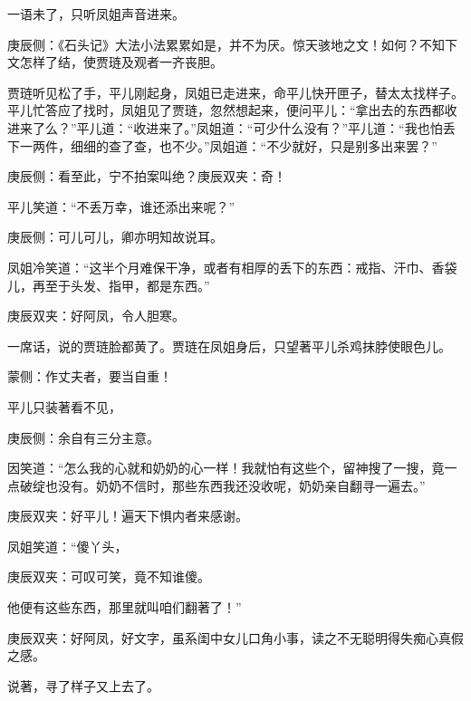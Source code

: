 \begin{parag}
    一语未了，只听凤姐声音进来。\begin{note}庚辰侧：《石头记》大法小法累累如是，并不为厌。惊天骇地之文！如何？不知下文怎样了结，使贾琏及观者一齐丧胆。\end{note}贾琏听见松了手，平儿刚起身，凤姐已走进来，命平儿快开匣子，替太太找样子。平儿忙答应了找时，凤姐见了贾琏，忽然想起来，便问平儿：“拿出去的东西都收进来了么？”平儿道：“收进来了。”凤姐道：“可少什么没有？”平儿道：“我也怕丢下一两件，细细的查了查，也不少。”凤姐道：“不少就好，只是别多出来罢？”\begin{note}庚辰侧：看至此，宁不拍案叫绝？庚辰双夹：奇！\end{note}平儿笑道：“不丢万幸，谁还添出来呢？”\begin{note}庚辰侧：可儿可儿，卿亦明知故说耳。\end{note}凤姐冷笑道：“这半个月难保干净，或者有相厚的丢下的东西：戒指、汗巾、香袋儿，再至于头发、指甲，都是东西。”\begin{note}庚辰双夹：好阿凤，令人胆寒。\end{note}一席话，说的贾琏脸都黄了。贾琏在凤姐身后，只望著平儿杀鸡抹脖使眼色儿。\begin{note}蒙侧：作丈夫者，要当自重！\end{note}平儿只装著看不见，\begin{note}庚辰侧：余自有三分主意。\end{note}因笑道：“怎么我的心就和奶奶的心一样！我就怕有这些个，留神搜了一搜，竟一点破绽也没有。奶奶不信时，那些东西我还没收呢，奶奶亲自翻寻一遍去。”\begin{note}庚辰双夹：好平儿！遍天下惧内者来感谢。\end{note}凤姐笑道：“傻丫头，\begin{note}庚辰双夹：可叹可笑，竟不知谁傻。\end{note}他便有这些东西，那里就叫咱们翻著了！”\begin{note}庚辰双夹：好阿凤，好文字，虽系闺中女儿口角小事，读之不无聪明得失痴心真假之感。\end{note}说著，寻了样子又上去了。
\end{parag}



